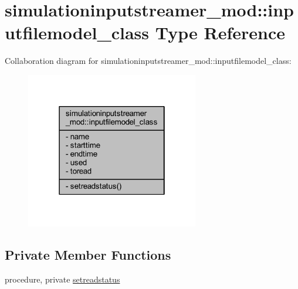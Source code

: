 \hypertarget{structsimulationinputstreamer__mod_1_1inputfilemodel__class}{}\section{simulationinputstreamer\+\_\+mod\+:\+:inputfilemodel\+\_\+class Type Reference}
\label{structsimulationinputstreamer__mod_1_1inputfilemodel__class}


Collaboration diagram for simulationinputstreamer\+\_\+mod\+:\+:inputfilemodel\+\_\+class\+:\nopagebreak
\begin{figure}[H]
\begin{center}
\leavevmode
\includegraphics[width=214pt]{structsimulationinputstreamer__mod_1_1inputfilemodel__class__coll__graph}
\end{center}
\end{figure}
\subsection*{Private Member Functions}
\begin{DoxyCompactItemize}
\item 
procedure, private \mbox{\hyperlink{structsimulationinputstreamer__mod_1_1inputfilemodel__class_a3761f6ea173cbede69de2ad1b3f94ac6}{setreadstatus}}
\end{DoxyCompactItemize}
